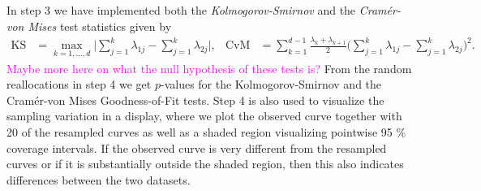 \documentclass[titlepage,11pt,twoside]{article}
\newcommand{\hl}[1]{\textcolor{magenta}{#1}}
\begin{document}
In step 3 we have implemented both the \emph{Kolmogorov-Smirnov} and the \emph{Cram\'er-von Mises} test statistics given by
\begin{align*}
\text{KS} &= \max_{k=1,\dotsc,d} \bigg\lvert \sum_{j=1}^k \lambda_{1j} - \sum_{j=1}^k \lambda_{2j} \bigg\rvert, &
\text{CvM} &= \sum_{k=1}^{d-1} \frac{\lambda_k + \lambda_{k+1}}{2} \bigg( \sum_{j=1}^k \lambda_{1j} - \sum_{j=1}^k \lambda_{2j} \bigg)^2.
\end{align*}
\hl{Maybe more here on what the null hypothesis of these tests is?} 
From the random reallocations in step 4 we get $p$-values for the Kolmogorov-Smirnov and the Cram\'er-von Mises Goodness-of-Fit tests. Step 4 is also used to visualize the sampling variation in a display, where we plot the observed curve together with 20 of the resampled curves as well as a shaded region visualizing pointwise 95 \% coverage intervals. If the observed curve is very different from the resampled curves or if it is substantially outside the shaded region, then this also indicates differences between the two datasets.


\bigskip
\end{document}

